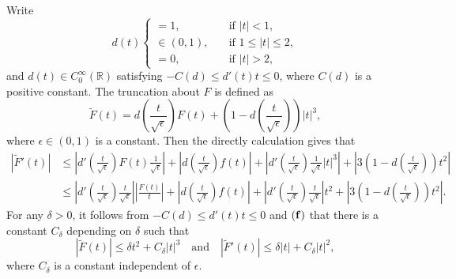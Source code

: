 \documentclass[12pt]{amsart}
\numberwithin{equation}{section}
\theoremstyle{definition}
\def\qaq{\quad\text{and}\quad}
\begin{document}
Write
\begin{equation*}
	d(t)\begin{cases}=1,&\quad\text{if } |t|<1,\\
		\in(0,1),&\quad\text{if } 1\leq|t|\leq 2,\\
		=0,&\quad\text{if } |t|> 2,
	\end{cases}
\end{equation*}
and $d(t)\in C_0^{\infty}(\mathbb{R})$ satisfying $-C(d)\leq d'(t)t\leq0$, where $C(d)$ is a positive constant. The truncation about $F$ is defined as
\begin{equation}\label{eq5}
	\tilde F(t)=d\left(\frac{t}{\sqrt{\epsilon}}\right)F(t)+\left(1-d\left(\frac{t}{\sqrt{\epsilon}}\right)\right)|t|^3,
\end{equation}
where $\epsilon\in(0,1)$ is a constant.
Then the directly calculation gives that
\begin{equation*}
\begin{split}
	|\tilde F'(t)|&\leq\left|d'(\frac{t}{\sqrt{\epsilon}}) F(t)\frac{1}{\sqrt{\epsilon}}\right|+\left|d(\frac{t}{\sqrt{\epsilon}})f(t)\right|+\left|d'(\frac{t}{\sqrt{\epsilon}})\frac{1}{\sqrt{\epsilon}}|t|^3\right|+\left|3(1-d(\frac{t}{\sqrt{\epsilon}}))t^{2}\right|\\
	&\leq\left|d'(\frac{t}{\sqrt{\epsilon}}) \frac{t}{\sqrt{\epsilon}}\right|\left|\frac{F(t)}{t}\right|+\left|d(\frac{t}{\sqrt{\epsilon}})f(t)\right|+\left|d'(\frac{t}{\sqrt{\epsilon}})\frac{t}{\sqrt{\epsilon}}\right|t^{2}
+\left|3(1-d(\frac{t}{\sqrt{\epsilon}}))t^{2}\right|.
	\end{split}
\end{equation*}
For any $\delta>0$, it follows from
 $-C(d)\leq d'(t)t\leq0$ and  ${\bf (f)}$ that there is a constant $C_\delta$ depending on $\delta$ such that
\begin{equation}\label{eq6}
	|\tilde F(t)|\leq \delta t^2+C_\delta |t|^3\qaq|\tilde F'(t)|\leq\delta |t|+C_\delta |t|^2,
\end{equation}
where $C_\delta$ is a constant independent of $\epsilon$.
\end{document}
